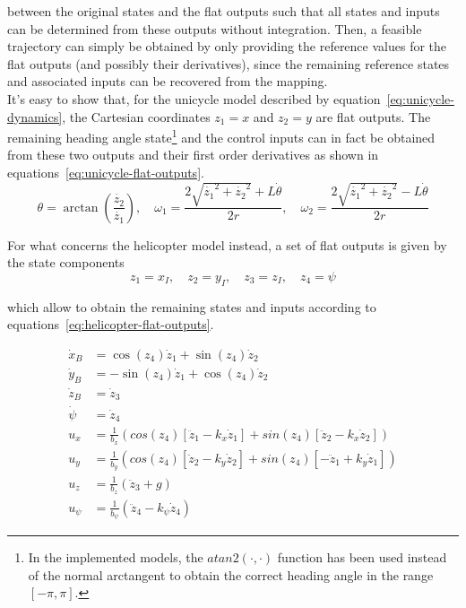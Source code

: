 \documentclass[../main.tex]{subfiles}
\begin{document}
between the original states and the flat outputs such that all states and inputs
can be determined from these outputs without integration. Then, a feasible
trajectory can simply  be obtained by only providing the reference values for the flat
outputs (and possibly their derivatives), since the remaining reference states
and associated inputs can be recovered from the mapping.\\
It's easy to show that, for the unicycle model described by
equation~\eqref{eq:unicycle-dynamics}, the Cartesian coordinates $z_1 = x$ and $z_2 = y$ are flat outputs. The
remaining heading angle state\footnote{In the implemented models, the
	$atan2(\cdot, \cdot)$ function has been used instead of the normal arctangent to
obtain the correct heading angle in the range $[-\pi, \pi]$.} and the control inputs can in fact be obtained
from these two outputs and their first order derivatives as shown in
equations~\eqref{eq:unicycle-flat-outputs}.
\begin{equation}\label{eq:unicycle-flat-outputs}
	\theta = \arctan\left(\frac{\dot{z_2}}{\dot{z_1}}\right), \quad
	\omega_1 = \frac{2 \sqrt{\dot{z_1}^2 + \dot{z_2}^2} + L \dot{\theta}}{2 r},
	\quad
	\omega_2 = \frac{2 \sqrt{\dot{z_1}^2 + \dot{z_2}^2} - L \dot{\theta}}{2 r}
\end{equation}

For what concerns the helicopter model instead, a set of flat outputs is given
by the state components
\begin{equation*}
	z_1 = x_I, \quad z_2 = y_I, \quad z_3 = z_I, \quad z_4 = \psi
\end{equation*}

which allow to obtain the remaining states and inputs according to
equations~\eqref{eq:helicopter-flat-outputs}.

\begin{equation}\label{eq:helicopter-flat-outputs}
	\begin{aligned}
		\dot{x}_B &= \cos(z_4) \dot{z}_1 + \sin(z_4) \dot{z}_2\\
		\dot{y}_B &= -\sin(z_4) \dot{z}_1 + \cos(z_4) \dot{z}_2\\
		\dot{z}_B &= \dot{z}_3\\
		\dot{\psi} &= \dot{z}_4\\
		u_x &= \frac{1}{b_x} \left( cos(z_4) \left[ \ddot{z}_1 - k_x \dot{z}_1
		\right] + sin(z_4) \left[ \ddot{z}_2 - k_x \dot{z}_2 \right] \right)\\
		u_y &= \frac{1}{b_y} \left( cos(z_4) \left[ \ddot{z}_2 - k_y \dot{z}_2 \right] + sin(z_4) \left[ -\ddot{z}_1 + k_y \dot{z}_1 \right] \right)\\
		u_z &= \frac{1}{b_z} \left( \ddot{z}_3 + g \right)\\
		u_{\psi} &= \frac{1}{b_{\psi}} \left( \ddot{z}_4 - k_{\psi} \dot{z}_4
			\right)
	\end{aligned}
\end{equation}
\end{document}
